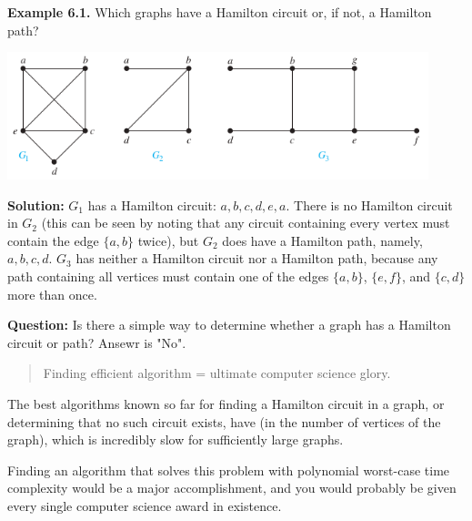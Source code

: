 \documentclass[aspectratio=169]{beamer}
\begin{document}
\begin{frame}[plain]{}

{\bf Example 6.1.} Which graphs have a Hamilton circuit or, 
if not, a Hamilton path?%

\begin{center}
        \includegraphics[height=3.7cm]{./img/lecture6-fig2.png}
 \end{center}
 \pause 
 
 {\bf Solution:} 
 $G_1$ has a Hamilton circuit: $a, b, c, d, e, a.$ 
 There is no Hamilton circuit in $G_2$ (this can
   be seen by noting that any circuit containing every vertex must contain 
   the edge $\{a, b\}$ twice),
   but $G_2$ does have a Hamilton path, namely, $a, b, c, d$. 
   $G_3$ has neither a Hamilton circuit nor a
    Hamilton path, because any path containing all vertices 
    must contain one of the edges $\{a, b\}$, $\{e, f\}$, and $\{c, d\}$ more than once.

\end{frame}

\begin{frame}[plain]{}

 {\bf Question:} Is there a simple way to determine 
  whether a graph has a Hamilton circuit or path? \pause
  Ansewr is "No".
  \medskip
  
  \begin{quote}
    Finding efficient algorithm = ultimate computer science glory.
  \end{quote}
  
  The best algorithms known so far for finding a Hamilton circuit
   in a graph, or determining that no such circuit exists, have 
    (in the number of vertices of the graph), 
   which is incredibly slow for sufficiently large graphs.
    \medskip
    
  Finding an algorithm that solves this problem with polynomial worst-case time
complexity would be a major accomplishment,
 and you would probably be given every single computer science award in existence.
 
\end{frame}
\end{document}
